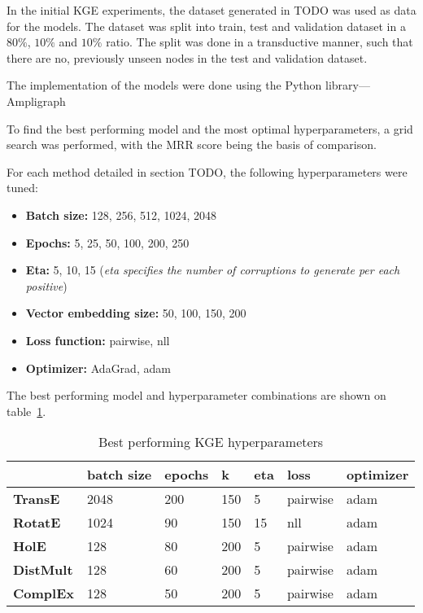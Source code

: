 In the initial KGE experiments, the dataset generated in TODO was used as data for the models.
The dataset was split into train, test and validation dataset in a $80\%$, $10\%$ and $10\%$ ratio.
The split was done in a transductive manner, such that there are no, previously unseen nodes in the test and validation
dataset.

The implementation of the models were done using the Python library—Ampligraph~\cite{ampligraph}

To find the best performing model and the most optimal hyperparameters, a grid search was performed, with the MRR score
being the basis of comparison.

For each method detailed in section TODO, the following hyperparameters were tuned:
\begin{itemize}
    \item \textbf{Batch size:} 128, 256, 512, 1024, 2048
    \item \textbf{Epochs:} 5, 25, 50, 100, 200, 250
    \item \textbf{Eta:} 5, 10, 15 (\textit{eta specifies the number of corruptions to generate per each positive})
    \item \textbf{Vector embedding size:} 50, 100, 150, 200
    \item \textbf{Loss function:} pairwise, nll
    \item \textbf{Optimizer:} AdaGrad, adam
\end{itemize}

The best performing model and hyperparameter combinations are shown on table~\ref{tab:kge-params}.

\begin{table}[!ht]
    \centering
    \begin{tabular}{|l|l|l|l|l|l|l|}
        \hline
        & \textbf{batch size} & \textbf{epochs} & \textbf{k} & \textbf{eta} & \textbf{loss} & \textbf{optimizer} \\ \hline
        \textbf{TransE} & 2048 & 200 & 150 & 5 & pairwise & adam \\ \hline
        \textbf{RotatE} & 1024 & 90 & 150 & 15 & nll & adam \\ \hline
        \textbf{HolE} & 128 & 80 & 200 & 5 & pairwise & adam \\ \hline
        \textbf{DistMult} & 128 & 60 & 200 & 5 & pairwise & adam \\ \hline
        \textbf{ComplEx} & 128 & 50 & 200 & 5 & pairwise & adam \\ \hline
    \end{tabular}
    \caption{Best performing KGE hyperparameters}
    \label{tab:kge-params}
\end{table}